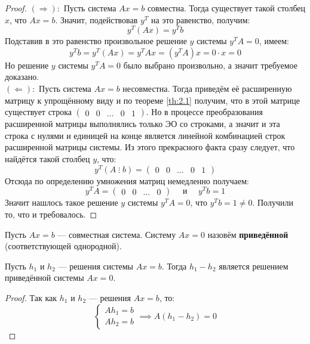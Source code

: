 \documentclass[11pt]{article}
\begin{document}
\begin{proof}
    $(\Longrightarrow):$ Пусть система $Ax = b$ совместна. Тогда существует такой столбец $x$, что $Ax = b$. Значит, подействовав $y^T$ на это равенство, получим:
    \[y^T \left(A x\right) = y^T b\]
    Подставив в это равенство произвольное решение $y$ системы $y^T A = 0$, имеем:
    \[y^T b = y^T \left(A x\right) = y^T A x = \left(y^T A \right) x = 0 \cdot x = 0\]
    Но решение $y$ системы $y^T A = 0$ было выбрано произвольно, а значит требуемое доказано.
    \\
    $(\Longleftarrow):$ Пусть система $Ax = b$ несовместна. Тогда приведём её расширенную матрицу к упрощённому виду и по теореме \ref{th:2.1} получим, что в этой
    матрице существует строка 
    $
        \begin{pmatrix}
            0 & 0 & \ldots & 0 & 1
        \end{pmatrix}
    $. Но в процессе преобразования расширенной матрицы выполнялись только ЭО со строками, а значит и эта строка с нулями и единицей на конце является линейной комбинацией строк расширенной матрицы системы.
    Из этого прекрасного факта сразу следует, что найдётся такой столбец $y$, что:
    \[y^T \left(A \; \vdots \; b \right) = 
    \begin{pmatrix}
        0 & 0 & \ldots & 0 & 1
    \end{pmatrix}
    \]
    Отсюда по определению умножения матриц немедленно получаем:
    \[y^T A = 
    \begin{pmatrix}
        0 & 0 & \ldots & 0
    \end{pmatrix}
    \quad \text{ и } \quad
    y^T b = 1
    \]
    Значит нашлось такое решение $y$ системы $y^T A = 0$, что $y^T b = 1 \neq 0$. Получили то, что и требовалось.
\end{proof}

\begin{definition}
    Пусть $Ax = b$ --- совместная система. Систему $Ax = 0$ назовём \textbf{приведённой} (соответствующей однородной).
\end{definition}

\begin{lemma}
    Пусть $h_1$ и $h_2$ --- решения системы $Ax = b$. Тогда $h_1 - h_2$ является решением приведённой системы $Ax = 0$.
\end{lemma}

\begin{proof}
    Так как $h_1$ и $h_2$ --- решения $Ax = b$, то:
    \begin{equation*}
        \begin{cases}
            A h_1 = b \\
            A h_2 = b
        \end{cases}
        \implies 
        A (h_1 - h_2) = 0
    \end{equation*}
\end{proof}
\end{document}
